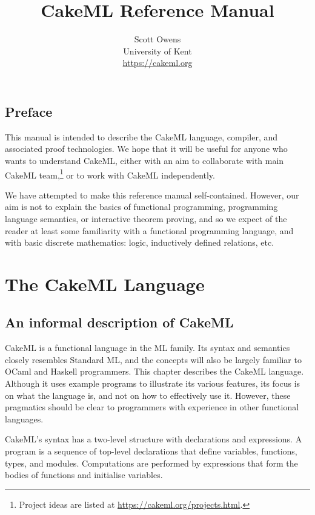 \documentclass[12pt,a4paper]{book}
\title{CakeML Reference Manual}
\author{Scott Owens\\
University of Kent\\
\url{https://cakeml.org}
}
\begin{document}
\sloppy
\maketitle
\frenchspacing

\frontmatter

\chapter{Preface}

This manual is intended to describe the CakeML language, compiler, and associated proof technologies. We hope that it will be useful for anyone who wants to understand  CakeML, either with an aim to collaborate with main CakeML team,\footnote{Project ideas are listed at \url{https://cakeml.org/projects.html}.}
or to work with CakeML independently.

We have attempted to make this reference manual self-contained. However, our aim is not to explain the basics of functional programming, programming language semantics, or interactive theorem proving, and so we expect of the reader at least some familiarity with a functional programming language, and with basic discrete mathematics: logic, inductively defined relations, etc.

\mainmatter
\tableofcontents


\part{The CakeML Language}
\label{part:lang}

\chapter{An informal description of CakeML}

CakeML is a functional language in the ML family. Its syntax and semantics
closely resembles Standard ML, and the concepts will also be largely familiar
to OCaml and Haskell programmers. This chapter describes the CakeML language.
Although it uses example programs to illustrate its various features, its focus
is on what the language is, and not on how to effectively use it. However,
these pragmatics should be clear to programmers with experience in other
functional languages.

CakeML's syntax has a two-level structure with declarations and expressions. A
program is a sequence of top-level declarations that define variables,
functions, types, and modules. Computations are performed by expressions that form the bodies of functions and initialise variables.
\end{document}
